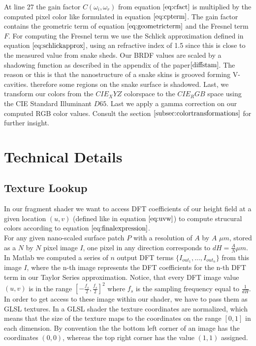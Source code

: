 At line 27 the gain factor $C(\omega_i, \omega_r)$ from equation $\ref{eq:cfact}$ is multiplied by the computed pixel color like formulated in equation $\ref{eq:cpterm}$. The gain factor contains the geometric term of equation $\ref{eq:geometricterm}$ and the Fresnel term $F$. For computing the Fresnel term we use the Schlick approximation defined in equation $\ref{eq:schlickapprox}$, using an refractive index of 1.5 since this is close to the measured value from snake sheds. Our BRDF values are scaled by a shadowing function as described in the appendix of the paper$\cite{diffstam}$. The reason or this is that the nanostructure of a snake skins is grooved forming V-cavities. therefore some regions on the snake surface is shadowed. Last, we transform our colors from the $CIE_XYZ$ colorspace to the $CIE_RGB$ space using the CIE Standard Illuminant $D65$. Last we apply a gamma correction on our computed RGB color values. Consult the section $\ref{subsec:colortransformations}$ for further insight.

\section{Technical Details}
\subsection{Texture Lookup}
\label{sec:texturelookupcoords}
In our fragment shader we want to access DFT coefficients of our height field at a given location $(u,v)$ (defined like in equation $\ref{eq:uvw}$) to compute strucural colors according to equation $\ref{eq:finalexpression}$. \\

For any given nano-scaled surface patch $P$ with a resolution of $A$ by $A$ $\mu m$, stored as a $N$ by $N$ pixel image $I$, one pixel in any direction corresponds to $dH = \frac{A}{N} \mu m$. In Matlab we computed a series of $n$ output DFT terms $\{I_{out_1},...,I_{out_n}\}$ from this image $I$, where the n-th image represents the DFT coefficients for the n-th DFT term in our Taylor Series approximation. Notice, that every DFT image value $(u,v)$ is in the range $[-\frac{f_s}{2}, \frac{f_s}{2}]^2$ where $f_s$ is the sampling frequency equal to $\frac{1}{dH}$. \\

In order to get access to these image within our shader, we have to pass them as GLSL textures. In a GLSL shader the texture coordinates are normalized, which means that the size of the texture maps to the coordinates on the range $[0,1]$ in each dimension. By convention the the bottom left corner of an image has the coordinates $(0,0)$, whereas the top right corner has the value $(1,1)$ assigned. \\ 


